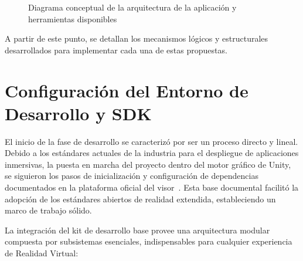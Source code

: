 \begin{figure}[!htb]
{
    }
    \caption{Diagrama conceptual de la arquitectura de la aplicación y herramientas disponibles}
    \label{fig:arquitectura_propuesta}
\end{figure}

A partir de este punto, se detallan los mecanismos lógicos y estructurales desarrollados para implementar cada una de estas propuestas.




\section{Configuración del Entorno de Desarrollo y SDK}

El inicio de la fase de desarrollo se caracterizó por ser un proceso directo y lineal. Debido a los estándares actuales de la industria para el despliegue de aplicaciones inmersivas, la puesta en marcha del proyecto dentro del motor gráfico de Unity, se siguieron los pasos de inicialización y configuración de dependencias documentados en la plataforma oficial del visor~\cite{metaquest2023}. Esta base documental facilitó la adopción de los estándares abiertos de realidad extendida, estableciendo un marco de trabajo sólido.

La integración del kit de desarrollo base provee una arquitectura modular compuesta por subsistemas esenciales, indispensables para cualquier experiencia de Realidad Virtual:

